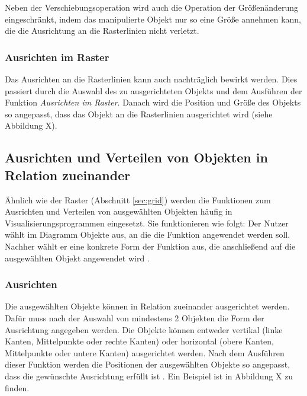 
Neben der Verschiebungsoperation wird auch die Operation der Größenänderung eingeschränkt, indem das manipulierte Objekt nur so eine Größe annehmen kann, die die Ausrichtung an die Rasterlinien nicht verletzt.

\subsubsection{Ausrichten im Raster}

Das Ausrichten an die Rasterlinien kann auch nachträglich bewirkt werden. Dies passiert durch die Auswahl des zu ausgerichteten Objekts und dem Ausführen der Funktion \textit{Ausrichten im Raster}. Danach wird die Position und Größe des Objekts so angepasst, dass das Objekt an die Rasterlinien ausgerichtet wird (siehe Abbildung X).  


\subsection{Ausrichten und Verteilen von Objekten in Relation zueinander}

Ähnlich wie der Raster (Abschnitt \ref{sec:grid}) werden die Funktionen zum Ausrichten und Verteilen von ausgewählten Objekten häufig in Visualisierungsprogrammen eingesetzt. Sie funktionieren wie folgt: Der Nutzer wählt im Diagramm Objekte aus, an die die Funktion angewendet werden soll. Nachher wählt er eine konkrete Form der Funktion aus, die anschließend auf die ausgewählten Objekt angewendet wird \cite{11Keynote}.

\subsubsection{Ausrichten}

Die ausgewählten Objekte können in Relation zueinander ausgerichtet werden. Dafür muss nach der Auswahl von mindestens 2 Objekten die Form der Ausrichtung angegeben werden. Die Objekte können entweder vertikal (linke Kanten, Mittelpunkte oder rechte Kanten) oder horizontal (obere Kanten, Mittelpunkte oder untere Kanten) ausgerichtet werden. Nach dem Ausführen dieser Funktion werden die Positionen der ausgewählten Objekte so angepasst, dass die gewünschte Ausrichtung erfüllt ist \cite{11Keynote, 08OmniGraffle}. Ein Beispiel ist in Abbildung X zu finden.

